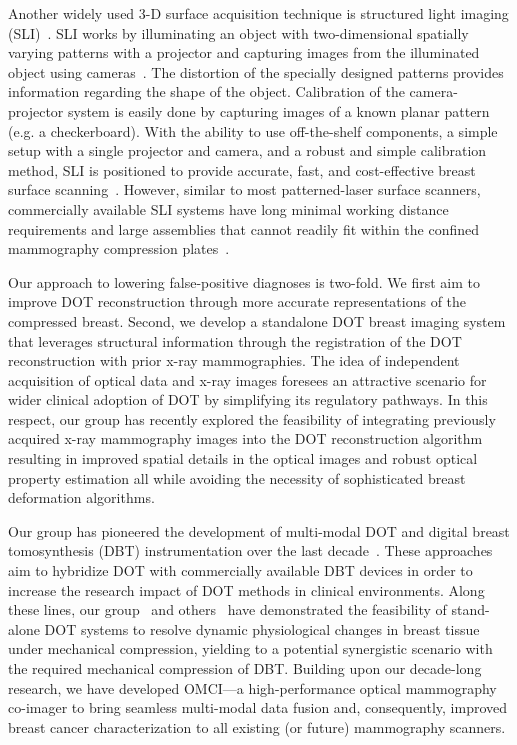 Another widely used 3-D surface acquisition technique is structured light imaging (SLI)~\cite{Yang2020, Zhang2018}. SLI works by illuminating an object with two-dimensional spatially varying patterns with a projector and capturing images from the illuminated object using cameras~\cite{Geng2011}. The distortion of the specially designed patterns provides information regarding the shape of the object. Calibration of the camera-projector system is easily done by capturing images of a known planar pattern (e.g. a checkerboard). With the ability to use off-the-shelf components, a simple setup with a single projector and camera, and a robust and simple calibration method, SLI is positioned to provide accurate, fast, and cost-effective breast surface scanning~\cite{Yang2020}. However, similar to most patterned-laser surface scanners, commercially available SLI systems have long minimal working distance requirements and large assemblies that cannot readily fit within the confined mammography compression plates~\cite{Zhang2018, Rodriguez2017}.

Our approach to lowering false-positive diagnoses is two-fold. We first aim to improve DOT reconstruction through more accurate representations of the compressed breast. Second, we develop a standalone DOT breast imaging system that leverages structural information through the registration of the DOT reconstruction with prior x-ray mammographies. The idea of independent acquisition of optical data and x-ray images foresees an attractive scenario for wider clinical adoption of DOT by simplifying its regulatory pathways. In this respect, our group has recently explored the feasibility of integrating previously acquired x-ray mammography images into the DOT reconstruction algorithm~\cite{Deng2015} resulting in improved spatial details in the optical images and robust optical property estimation all while avoiding the necessity of sophisticated breast deformation algorithms\cite{Azar2007}.

Our group has pioneered the development of multi-modal DOT and digital breast tomosynthesis (DBT) instrumentation over the last decade~\cite{Fang2009,Zimmermann2017}. These approaches aim to hybridize DOT with commercially available DBT devices in order to increase the research impact of DOT methods in clinical environments. Along these lines, our group~\cite{Carp2006,Carp2008,Carp2013} and others~\cite{Wang2008,Fournier2009,Alabdi2011} have demonstrated the feasibility of stand-alone DOT systems to resolve dynamic physiological changes in breast tissue under mechanical compression, yielding to a potential synergistic scenario with the required mechanical compression of DBT. Building upon our decade-long research, we have developed OMCI---a high-performance optical mammography co-imager to bring seamless multi-modal data fusion and, consequently, improved breast cancer characterization to all existing (or future) mammography scanners. 

